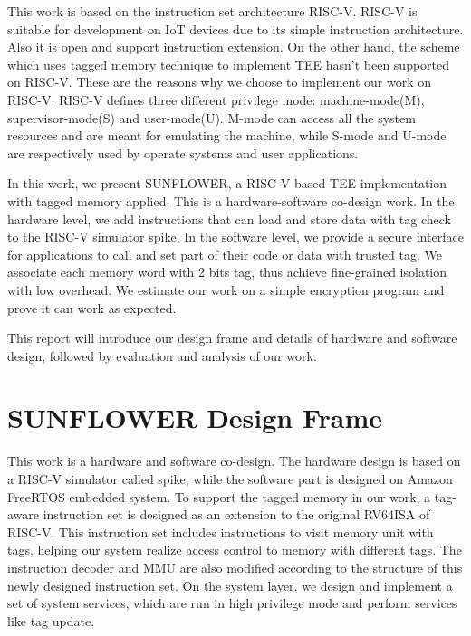 \documentclass[conference]{IEEEtran}
\begin{document}
This work is based on the instruction set architecture RISC-V.\cite{RISCV} RISC-V is suitable for development on IoT devices due to its simple instruction architecture. Also it is open and support instruction extension. On the other hand, the scheme which uses tagged memory technique to implement TEE hasn't been supported on RISC-V. These are the reasons why we choose to implement our work on RISC-V. RISC-V defines three different privilege mode: machine-mode(M), supervisor-mode(S) and user-mode(U). M-mode can access all the system resources and are meant for emulating the machine, while S-mode and U-mode are respectively used by operate systems and user applications.

In this work, we present SUNFLOWER, a RISC-V based TEE implementation with tagged memory applied. This is a hardware-software co-design work. In the hardware level, we add instructions that can load and store data with tag check to the RISC-V simulator spike. In the software level, we provide a secure interface for applications to call and set part of their code or data with trusted tag. We associate each memory word with 2 bits tag, thus achieve fine-grained isolation with low overhead. We estimate our work on a simple encryption program and prove it can work as expected. 

This report will introduce our design frame and details of hardware and software design, followed by evaluation and analysis of our work.



\section{SUNFLOWER Design Frame}
This work is a hardware and software co-design. The hardware design is based on a RISC-V simulator called spike, while the software part is designed on Amazon FreeRTOS embedded system. To support the tagged memory in our work, a tag-aware instruction set is designed as an extension to the original RV64ISA of RISC-V. This instruction set includes instructions to visit memory unit with tags, helping our system realize access control to memory with different tags. The instruction decoder and MMU are also modified according to the structure of this newly designed instruction set. On the system layer, we design and implement a set of system services, which are run in high privilege mode and perform services like tag update.


\end{document}
